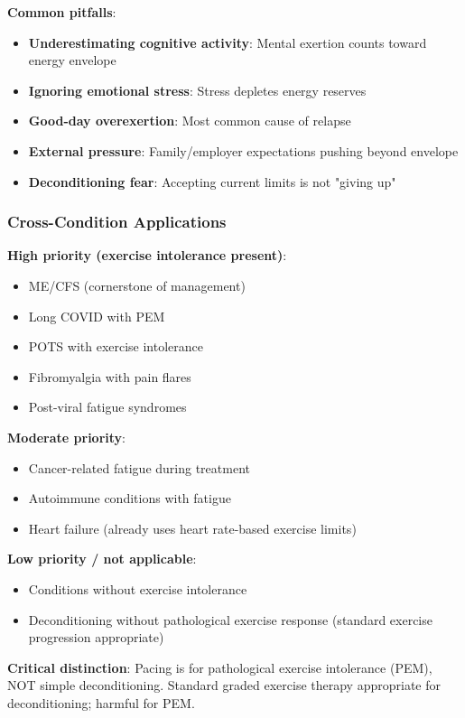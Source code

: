 \textbf{Common pitfalls}:
\begin{itemize}
    \item \textbf{Underestimating cognitive activity}: Mental exertion counts toward energy envelope
    \item \textbf{Ignoring emotional stress}: Stress depletes energy reserves
    \item \textbf{Good-day overexertion}: Most common cause of relapse
    \item \textbf{External pressure}: Family/employer expectations pushing beyond envelope
    \item \textbf{Deconditioning fear}: Accepting current limits is not "giving up"
\end{itemize}

\subsubsection{Cross-Condition Applications}

\textbf{High priority (exercise intolerance present)}:
\begin{itemize}
    \item ME/CFS (cornerstone of management)
    \item Long COVID with PEM
    \item POTS with exercise intolerance
    \item Fibromyalgia with pain flares
    \item Post-viral fatigue syndromes
\end{itemize}

\textbf{Moderate priority}:
\begin{itemize}
    \item Cancer-related fatigue during treatment
    \item Autoimmune conditions with fatigue
    \item Heart failure (already uses heart rate-based exercise limits)
\end{itemize}

\textbf{Low priority / not applicable}:
\begin{itemize}
    \item Conditions without exercise intolerance
    \item Deconditioning without pathological exercise response (standard exercise progression appropriate)
\end{itemize}

\textbf{Critical distinction}: Pacing is for pathological exercise intolerance (PEM), NOT simple deconditioning. Standard graded exercise therapy appropriate for deconditioning; harmful for PEM.

